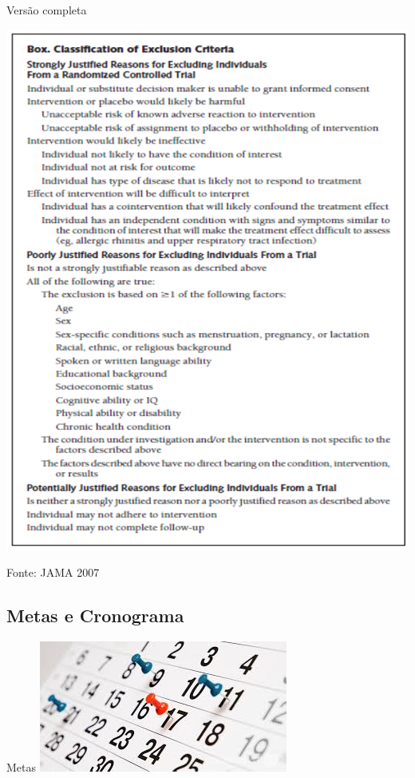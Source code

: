 \documentclass{beamer}
\begin{document}
\begin{frame}{Versão completa}
  \begin{center}
    \includegraphics[height=.9\textheight]{Etapas/box-crit-exclusao}
  \end{center}
  \small
  Fonte: JAMA 2007
\end{frame}

\subsection{Metas e Cronograma}

\begin{frame}{Metas}
  \includegraphics[width=\textwidth]{Etapas/metas}
\end{frame}
\end{document}
